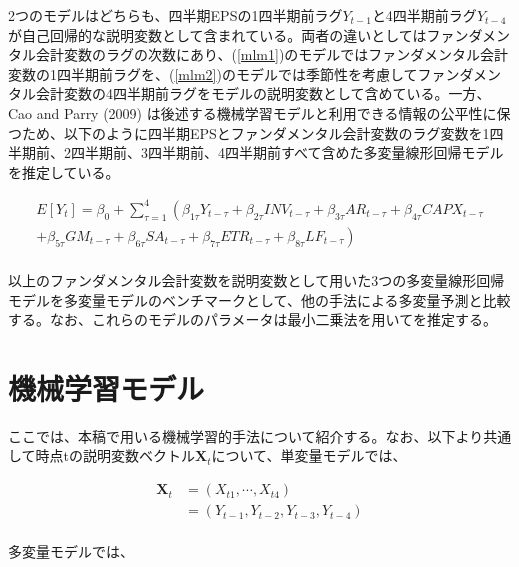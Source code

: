 \documentclass[a4paper, 12pt]{jsreport}
\begin{document}
2つのモデルはどちらも、四半期EPSの1四半期前ラグ$Y_{t-1}$と4四半期前ラグ$Y_{t-4}$が自己回帰的な説明変数として含まれている。両者の違いとしてはファンダメンタル会計変数のラグの次数にあり、(\ref{mlm1})のモデルではファンダメンタル会計変数の1四半期前ラグを、(\ref{mlm2})のモデルでは季節性を考慮してファンダメンタル会計変数の4四半期前ラグをモデルの説明変数として含めている。一方、Cao and Parry (2009) は後述する機械学習モデルと利用できる情報の公平性に保つため、以下のように四半期EPSとファンダメンタル会計変数のラグ変数を1四半期前、2四半期前、3四半期前、4四半期前すべて含めた多変量線形回帰モデルを推定している。

\begin{equation}
  \begin{split}
    E[Y_t] = \beta_0 + \sum^{4}_{\tau=1} \left( \beta_{1\tau}Y_{t-\tau} 
    + \beta_{2\tau}INV_{t-\tau} + \beta_{3\tau}AR_{t-\tau} + \beta_{4\tau}CAPX_{t-\tau} \right. \\
    \left. + \beta_{5\tau}GM_{t-\tau} + \beta_{6\tau}SA_{t-\tau} + \beta_{7\tau}ETR_{t-\tau} + \beta_{8\tau}LF_{t-\tau} \right) \\
  \end{split}
\end{equation}

以上のファンダメンタル会計変数を説明変数として用いた3つの多変量線形回帰モデルを多変量モデルのベンチマークとして、他の手法による多変量予測と比較する。なお、これらのモデルのパラメータは最小二乗法を用いてを推定する。

\section{機械学習モデル}


ここでは、本稿で用いる機械学習的手法について紹介する。なお、以下より共通して時点tの説明変数ベクトル$\bm{X}_t$について、単変量モデルでは、

\begin{equation}
  \begin{split}
    \bm{X}_t &= (X_{t1}, \cdots ,X_{t4}) \\
    &= (Y_{t-1}, Y_{t-2}, Y_{t-3}, Y_{t-4}) \\
  \end{split}
\end{equation}

多変量モデルでは、
\end{document}
